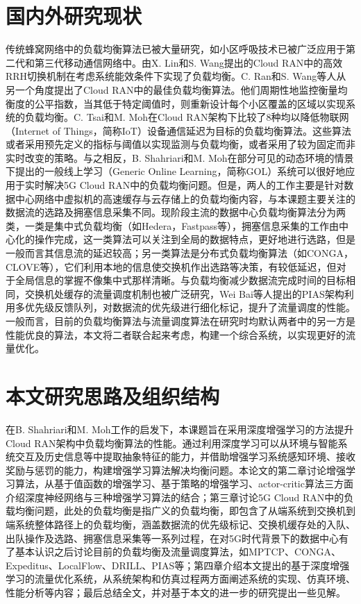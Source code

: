 \section{国内外研究现状}
传统蜂窝网络中的负载均衡算法已被大量研究，如小区呼吸技术\cite{niu2010cell}已被广泛应用于第二代和第三代移动通信网络中。由X. Lin和S. Wang提出的Cloud RAN中的高效RRH切换机制在考虑系统能效条件下实现了负载均衡\cite{lin2010efficient}。C. Ran和S. Wang等人\cite{ran2015optimal}从另一个角度提出了Cloud RAN中的最佳负载均衡算法。他们周期性地监控衡量均衡度的公平指数，当其低于特定阈值时，则重新设计每个小区覆盖的区域以实现系统的负载均衡。C. Tsai和M. Moh在Cloud RAN架构下比较了8种均以降低物联网（Internet of Things，简称IoT）设备通信延迟为目标的负载均衡算法。这些算法或者采用预先定义的指标与阈值以实现监测与负载均衡，或者采用了较为固定而非实时改变的策略。与之相反，B. Shahriari和M. Moh在部分可见的动态环境的情景下提出的一般线上学习（Generic Online Learning，简称GOL）系统可以很好地应用于实时解决5G Cloud RAN中的负载均衡问题。但是，两人的工作主要是针对数据中心网络中虚拟机的高速缓存与云存储上的负载均衡内容，与本课题主要关注的数据流的选路及拥塞信息采集不同。现阶段主流的数据中心负载均衡算法分为两类，一类是集中式负载均衡（如Hedera，Fastpass等），拥塞信息采集的工作由中心化的操作完成，这一类算法可以关注到全局的数据特点，更好地进行选路，但是一般而言其信息流的延迟较高；另一类算法是分布式负载均衡算法（如CONGA，CLOVE等），它们利用本地的信息使交换机作出选路等决策，有较低延迟，但对于全局信息的掌握不像集中式那样清晰。与负载均衡减少数据流完成时间的目标相同，交换机处缓存的流量调度机制也被广泛研究，Wei Bai等人提出的PIAS架构利用多优先级反馈队列，对数据流的优先级进行细化标记，提升了流量调度的性能。一般而言，目前的负载均衡算法与流量调度算法在研究时均默认两者中的另一方是性能优良的算法，本文将二者联合起来考虑，构建一个综合系统，以实现更好的流量优化。


\section{本文研究思路及组织结构}
在B. Shahriari和M. Moh工作的启发下，本课题旨在采用深度增强学习的方法提升Cloud RAN架构中负载均衡算法的性能。通过利用深度学习可以从环境与智能系统交互及历史信息等中提取抽象特征的能力，并借助增强学习系统感知环境、接收奖励与惩罚的能力，构建增强学习算法解决均衡问题。本论文的第二章讨论增强学习算法，从基于值函数的增强学习、基于策略的增强学习、actor-critic算法三方面介绍深度神经网络与三种增强学习算法的结合；第三章讨论5G Cloud RAN中的负载均衡问题，此处的负载均衡是指广义的负载均衡，即包含了从端系统到交换机到端系统整体路径上的负载均衡，涵盖数据流的优先级标记、交换机缓存处的入队、出队操作及选路、拥塞信息采集等一系列过程，在对5G时代背景下的数据中心有了基本认识之后讨论目前的负载均衡及流量调度算法，如MPTCP、CONGA、Expeditus、LocalFlow、DRILL、PIAS等；第四章介绍本文提出的基于深度增强学习的流量优化系统，从系统架构和仿真过程两方面阐述系统的实现、仿真环境、性能分析等内容；最后总结全文，并对基于本文的进一步的研究提出一些见解。